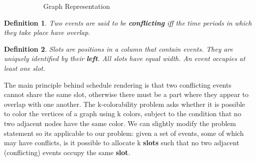 \documentclass[12pt]{article}
\newtheorem{definition}{Definition}
\begin{document}
\begin{figure}[H]
\begin{subfigure}{.6\textwidth}
        \caption{Graph Representation}
        \label{fig:graphexp1}
    \end{subfigure}%
    \caption{}
    \label{}
\end{figure}

\begin{definition}
    Two events are said to be \textbf{conflicting} iff the time periods in which they take place have overlap.
\end{definition}

\begin{definition}
    Slots are positions in a column that contain events. They are uniquely identified by their \textbf{left}. All slots have equal width. An event occupies at least one slot. 
\end{definition}

The main principle behind schedule rendering is that two conflicting events cannot share the same slot, otherwise there must be a part where they appear to overlap with one another.
The k-colorability problem asks whether it is possible to color the vertices of a graph using k colors, subject to the condition that no two adjacent nodes have the same color. We can slightly modify the problem statement so its applicable to our problem: given a set of events, some of which may have conflicts, is it possible to allocate k \textbf{slots} such that no two adjacent (conflicting) events occupy the same \textbf{slot}.
\end{document}
